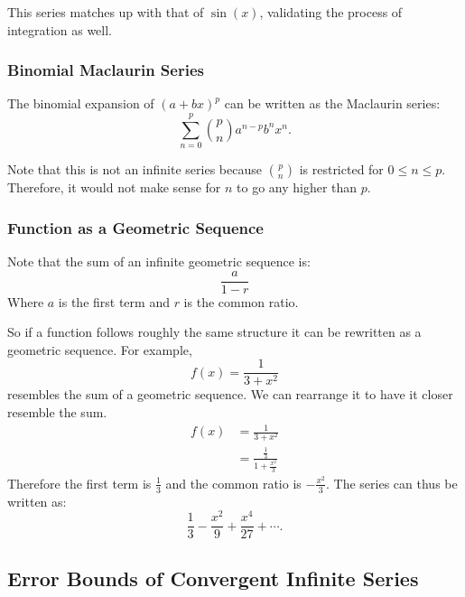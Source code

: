 \documentclass[12pt]{article}
\begin{document}
This series matches up with that of $\sin(x)$, validating the process of integration as well.

\subsubsection{Binomial Maclaurin Series}

\noindent The binomial expansion of $(a + bx)^p$ can be written as the Maclaurin series:
\[ \sum_{n=0}^{p} \binom{p}{n} a^{n-p} b^n x^n. \]

Note that this is not an infinite series because $\binom{p}{n}$ is restricted for $0 \le n \le p$. Therefore, it would not make sense for $n$ to go any higher than $p$.

\subsubsection{Function as a Geometric Sequence}
\noindent Note that the sum of an infinite geometric sequence is:
\[ \frac{a}{1-r} \]
Where $a$ is the first term and $r$ is the common ratio.

\noindent So if a function follows roughly the same structure it can be rewritten as a geometric sequence. For example,
\[ f(x) = \frac{1}{3+x^2} \]
resembles the sum of a geometric sequence. We can rearrange it to have it closer resemble the sum.
\begin{align*}
    f(x) & = \frac{1}{3+x^2}                       \\[6pt]
         & = \frac{\frac{1}{3}}{1 + \frac{x^2}{3}}
\end{align*}
Therefore the first term is $\frac{1}{3}$ and the common ratio is $-\frac{x^2}{3}$. The series can thus be written as:
\[ \frac{1}{3} - \frac{x^2}{9} + \frac{x^4}{27} + \cdots. \]

\subsection{Error Bounds of Convergent Infinite Series}
\end{document}

